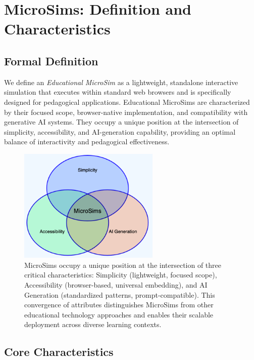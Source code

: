 \section{MicroSims: Definition and Characteristics}
\label{sec:definition}

\subsection{Formal Definition}

We define an \textit{Educational MicroSim} as a lightweight, standalone interactive simulation that executes within standard web browsers and is specifically designed for pedagogical applications. Educational MicroSims are characterized by their focused scope, browser-native implementation, and compatibility with generative AI systems. They occupy a unique position at the intersection of simplicity, accessibility, and AI-generation capability, providing an optimal balance of interactivity and pedagogical effectiveness.

\begin{figure}[htbp]
\centering
\includegraphics[width=0.6\textwidth]{figures/microsim-uniqueness.png}
\caption{MicroSims occupy a unique position at the intersection of three critical characteristics: Simplicity (lightweight, focused scope), Accessibility (browser-based, universal embedding), and AI Generation (standardized patterns, prompt-compatible). This convergence of attributes distinguishes MicroSims from other educational technology approaches and enables their scalable deployment across diverse learning contexts.}
\label{fig:uniqueness}
\end{figure}

\subsection{Core Characteristics}

